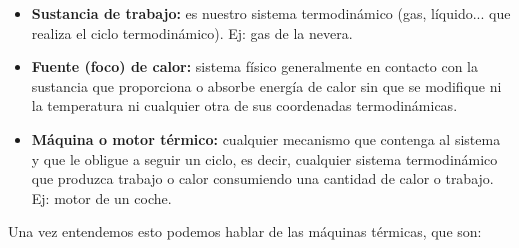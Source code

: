 \documentclass[12pt,a4paper]{article}
\begin{document}
\begin{itemize} 
\item \textbf{Sustancia de trabajo:} es nuestro sistema termodinámico (gas, líquido... que realiza el ciclo termodinámico). Ej: gas de la nevera.

\item \textbf{Fuente (foco) de calor:} sistema físico generalmente en contacto con la sustancia que proporciona o absorbe energía de calor sin que se modifique ni la temperatura ni cualquier otra de sus coordenadas termodinámicas. 

\item \textbf{Máquina o motor térmico:} cualquier mecanismo que contenga al sistema y que le obligue a seguir un ciclo, es decir, cualquier sistema termodinámico que produzca trabajo o calor consumiendo una cantidad de calor o trabajo. Ej: motor de un coche.
\end{itemize}

Una vez entendemos esto podemos hablar de las máquinas térmicas, que son:
\end{document}
